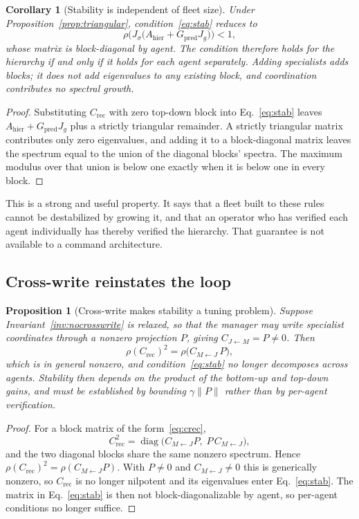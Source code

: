 \documentclass[11pt]{article}
\newtheorem{proposition}{Proposition}
\newtheorem{corollary}{Corollary}
\begin{document}
\begin{corollary}[Stability is independent of fleet size]
\label{cor:fleetsize}
Under Proposition~\ref{prop:triangular}, condition~\eqref{eq:stab} reduces to
\[
\rho\Big(J_\sigma\big(A_{\mathrm{hier}}+G_{\mathrm{pred}}J_g\big)\Big)<1 ,
\]
whose matrix is block-diagonal by agent. The condition therefore holds for the hierarchy if and only if it holds for each agent separately. Adding specialists adds blocks; it does not add eigenvalues to any existing block, and coordination contributes no spectral growth.
\end{corollary}

\begin{proof}
Substituting $C_{\mathrm{rec}}$ with zero top-down block into Eq.~\eqref{eq:stab} leaves $A_{\mathrm{hier}}+G_{\mathrm{pred}}J_g$ plus a strictly triangular remainder. A strictly triangular matrix contributes only zero eigenvalues, and adding it to a block-diagonal matrix leaves the spectrum equal to the union of the diagonal blocks' spectra. The maximum modulus over that union is below one exactly when it is below one in every block.
\end{proof}

This is a strong and useful property. It says that a fleet built to these rules cannot be destabilized by growing it, and that an operator who has verified each agent individually has thereby verified the hierarchy. That guarantee is not available to a command architecture.

\subsection{Cross-write reinstates the loop}

\begin{proposition}[Cross-write makes stability a tuning problem]
\label{prop:crosswritegain}
Suppose Invariant~\ref{inv:nocrosswrite} is relaxed, so that the manager may write specialist coordinates through a nonzero projection $P$, giving $C_{J\leftarrow M}=P\neq0$. Then
\[
\rho(C_{\mathrm{rec}})^{2}=\rho\big(C_{M\leftarrow J}\,P\big),
\]
which is in general nonzero, and condition~\eqref{eq:stab} no longer decomposes across agents. Stability then depends on the product of the bottom-up and top-down gains, and must be established by bounding $\gamma\|P\|$ rather than by per-agent verification.
\end{proposition}

\begin{proof}
For a block matrix of the form~\eqref{eq:crec},
\[
C_{\mathrm{rec}}^{2}=\operatorname{diag}\big(C_{M\leftarrow J}P,\;P\,C_{M\leftarrow J}\big),
\]
and the two diagonal blocks share the same nonzero spectrum. Hence $\rho(C_{\mathrm{rec}})^{2}=\rho(C_{M\leftarrow J}P)$. With $P\neq0$ and $C_{M\leftarrow J}\neq0$ this is generically nonzero, so $C_{\mathrm{rec}}$ is no longer nilpotent and its eigenvalues enter Eq.~\eqref{eq:stab}. The matrix in Eq.~\eqref{eq:stab} is then not block-diagonalizable by agent, so per-agent conditions no longer suffice.
\end{proof}
\end{document}
